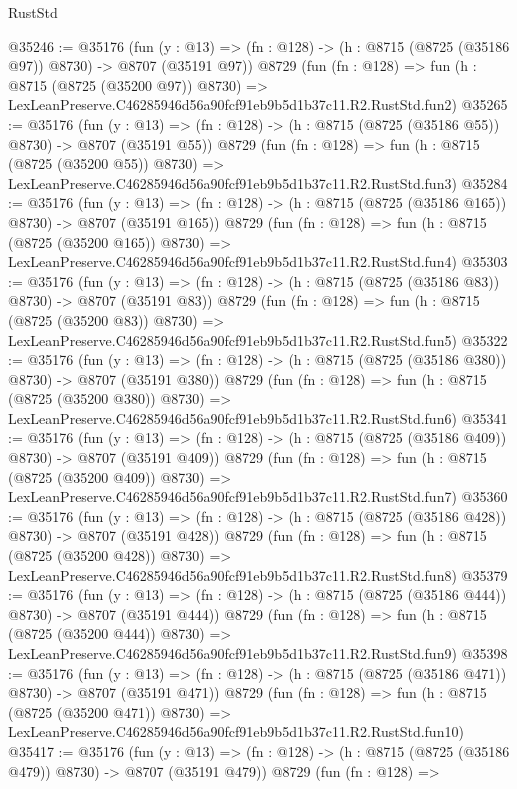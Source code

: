 \begin{lexlean}{RustStd}
\begin{coremodule}
@35246 := @35176
    (fun (y : @13) => (fn : @128) -> (h : @8715 (@8725 (@35186 @97)) @8730) -> @8707 (@35191 @97))
    @8729
    (fun (fn : @128) =>
    fun (h : @8715 (@8725 (@35200 @97)) @8730) =>
    LexLeanPreserve.C46285946d56a90fcf91eb9b5d1b37c11.R2.RustStd.fun2)
@35265 := @35176
    (fun (y : @13) => (fn : @128) -> (h : @8715 (@8725 (@35186 @55)) @8730) -> @8707 (@35191 @55))
    @8729
    (fun (fn : @128) =>
    fun (h : @8715 (@8725 (@35200 @55)) @8730) =>
    LexLeanPreserve.C46285946d56a90fcf91eb9b5d1b37c11.R2.RustStd.fun3)
@35284 := @35176
    (fun (y : @13) => (fn : @128) -> (h : @8715 (@8725 (@35186 @165)) @8730) -> @8707 (@35191 @165))
    @8729
    (fun (fn : @128) =>
    fun (h : @8715 (@8725 (@35200 @165)) @8730) =>
    LexLeanPreserve.C46285946d56a90fcf91eb9b5d1b37c11.R2.RustStd.fun4)
@35303 := @35176
    (fun (y : @13) => (fn : @128) -> (h : @8715 (@8725 (@35186 @83)) @8730) -> @8707 (@35191 @83))
    @8729
    (fun (fn : @128) =>
    fun (h : @8715 (@8725 (@35200 @83)) @8730) =>
    LexLeanPreserve.C46285946d56a90fcf91eb9b5d1b37c11.R2.RustStd.fun5)
@35322 := @35176
    (fun (y : @13) => (fn : @128) -> (h : @8715 (@8725 (@35186 @380)) @8730) -> @8707 (@35191 @380))
    @8729
    (fun (fn : @128) =>
    fun (h : @8715 (@8725 (@35200 @380)) @8730) =>
    LexLeanPreserve.C46285946d56a90fcf91eb9b5d1b37c11.R2.RustStd.fun6)
@35341 := @35176
    (fun (y : @13) => (fn : @128) -> (h : @8715 (@8725 (@35186 @409)) @8730) -> @8707 (@35191 @409))
    @8729
    (fun (fn : @128) =>
    fun (h : @8715 (@8725 (@35200 @409)) @8730) =>
    LexLeanPreserve.C46285946d56a90fcf91eb9b5d1b37c11.R2.RustStd.fun7)
@35360 := @35176
    (fun (y : @13) => (fn : @128) -> (h : @8715 (@8725 (@35186 @428)) @8730) -> @8707 (@35191 @428))
    @8729
    (fun (fn : @128) =>
    fun (h : @8715 (@8725 (@35200 @428)) @8730) =>
    LexLeanPreserve.C46285946d56a90fcf91eb9b5d1b37c11.R2.RustStd.fun8)
@35379 := @35176
    (fun (y : @13) => (fn : @128) -> (h : @8715 (@8725 (@35186 @444)) @8730) -> @8707 (@35191 @444))
    @8729
    (fun (fn : @128) =>
    fun (h : @8715 (@8725 (@35200 @444)) @8730) =>
    LexLeanPreserve.C46285946d56a90fcf91eb9b5d1b37c11.R2.RustStd.fun9)
@35398 := @35176
    (fun (y : @13) => (fn : @128) -> (h : @8715 (@8725 (@35186 @471)) @8730) -> @8707 (@35191 @471))
    @8729
    (fun (fn : @128) =>
    fun (h : @8715 (@8725 (@35200 @471)) @8730) =>
    LexLeanPreserve.C46285946d56a90fcf91eb9b5d1b37c11.R2.RustStd.fun10)
@35417 := @35176
    (fun (y : @13) => (fn : @128) -> (h : @8715 (@8725 (@35186 @479)) @8730) -> @8707 (@35191 @479))
    @8729
    (fun (fn : @128) =>

\end{coremodule}
\end{lexlean}
